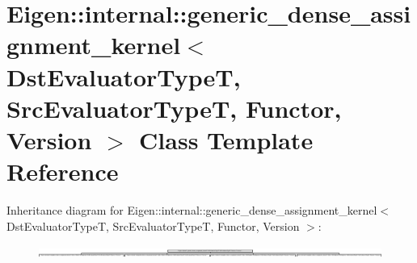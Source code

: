 \hypertarget{class_eigen_1_1internal_1_1generic__dense__assignment__kernel}{}\section{Eigen\+:\+:internal\+:\+:generic\+\_\+dense\+\_\+assignment\+\_\+kernel$<$ Dst\+Evaluator\+TypeT, Src\+Evaluator\+TypeT, Functor, Version $>$ Class Template Reference}
\label{class_eigen_1_1internal_1_1generic__dense__assignment__kernel}
Inheritance diagram for Eigen\+:\+:internal\+:\+:generic\+\_\+dense\+\_\+assignment\+\_\+kernel$<$ Dst\+Evaluator\+TypeT, Src\+Evaluator\+TypeT, Functor, Version $>$\+:\begin{figure}[H]
\begin{center}
\leavevmode
\includegraphics[height=0.328639cm]{class_eigen_1_1internal_1_1generic__dense__assignment__kernel}
\end{center}
\end{figure}
